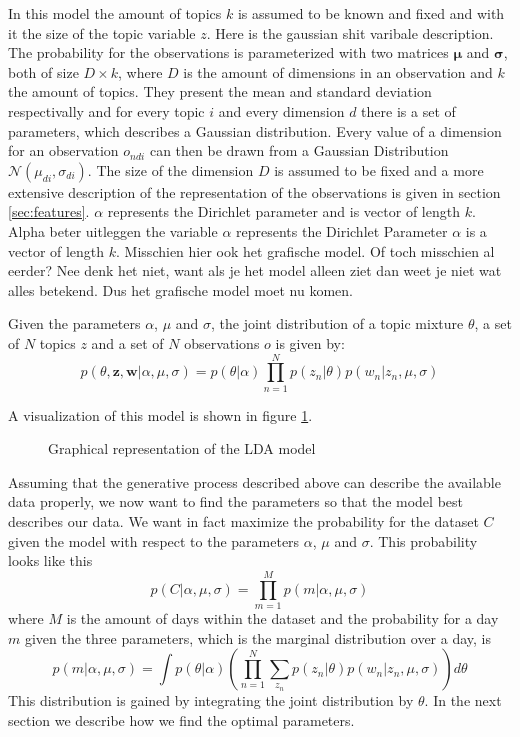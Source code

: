 \documentclass[11pt,a4paper]{article}
\begin{document}
In this model the amount of topics $k$ is assumed to be known and fixed and with it the size of the topic variable $z$.
 Here is the gaussian shit varibale description.
The probability for the observations is parameterized with two matrices $\boldsymbol\mu$ and $\boldsymbol\sigma$, both of size $D\times k$, where $D$ is the amount of dimensions in an observation and $k$ the amount of topics. They present the mean and standard deviation respectivally and for every topic $i$ and every dimension $d$ there is a set of parameters, which describes a Gaussian distribution.  Every value of a dimension for an observation $o_{ndi}$ can then be drawn from a Gaussian Distribution $\mathcal{N}(\mu_{di},\sigma_{di})$.
The size of the dimension $D$ is assumed to be fixed and a more extensive description of the representation of the observations is given in section \ref{sec:features}. $\alpha$ represents the Dirichlet parameter and is vector of length $k$.
Alpha beter uitleggen
the variable $\alpha$ represents the Dirichlet Parameter
$\alpha$ is a vector of length $k$.
Misschien hier ook het grafische model. Of toch misschien al eerder? Nee denk het niet, want als je het model alleen ziet dan weet je niet wat alles betekend. Dus het grafische model moet nu komen.

Given the parameters $\alpha$, $\mu$ and $\sigma$, the joint distribution of a topic mixture $\theta$, a set of $N$ topics $z$ and a set of $N$ observations $o$ is given by:
\begin{equation}
 p(\theta,\textbf{z},\textbf{w}|\alpha,\mu,\sigma) = p(\theta|\alpha) \prod_{n=1}^N p(z_n|\theta) p(w_n|z_n,\mu,\sigma)
\end{equation}


A visualization of this model is shown in figure \ref{fig:modelExt}.

\begin{figure}[t!]
\centering
\def\svgwidth{0.8\textwidth}

\caption{Graphical representation of the LDA model}
\label{fig:modelExt}
\end{figure}


  
Assuming that the generative process described above can describe the available data properly, we now want to find the parameters so that the model best describes our data. We want in fact maximize the probability for the dataset $C$ given the model with respect to the parameters $\alpha$, $\mu$ and $\sigma$. This probability looks like this
\begin{equation}
p(C|\alpha,\mu,\sigma) = \prod_{m=1}^M p(m|\alpha,\mu,\sigma)
\end{equation}
where $M$ is the amount of days within the dataset and the probability for a day $m$ given the three parameters, which is the marginal distribution over a day, is
\begin{equation} 
p(m|\alpha,\mu,\sigma) = \int p(\theta|\alpha)  \left( \prod_{n=1}^N \sum_{z_n} p(z_n|\theta) p(w_n|z_n, \mu,\sigma)  \right) d\theta
\end{equation}
This distribution is gained by integrating the joint distribution by $\theta$.
In the next section we describe how we find the optimal parameters.
\end{document}
